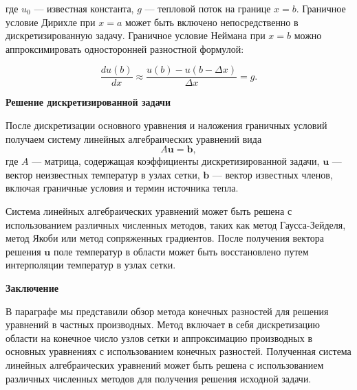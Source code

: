 где $u_0$ — известная константа,
$g$ — тепловой поток на границе $x = b$.
Граничное условие Дирихле при $x = a$ может быть
включено непосредственно в дискретизированную задачу.
Граничное условие Неймана при $x = b$ можно аппроксимировать
односторонней разностной формулой:

\begin{equation*}
\frac{du(b)}{dx} \approx \frac{u(b) - u(b - \Delta x)}{\Delta x} = g.
\end{equation*}

\textbf{Решение дискретизированной задачи}

После дискретизации основного уравнения и наложения граничных
условий получаем систему линейных алгебраических уравнений вида
\begin{equation*}
A\mathbf{u} = \mathbf{b},
\end{equation*}
где $A$ — матрица, содержащая коэффициенты дискретизированной
задачи, $\mathbf{u}$ — вектор неизвестных температур в узлах сетки,
$\mathbf{b}$ — вектор известных членов, включая граничные
условия и термин источника тепла.

Система линейных алгебраических уравнений может быть решена с
использованием различных численных методов, таких как метод
Гаусса-Зейделя, метод Якоби или метод сопряженных градиентов.
После получения вектора решения $\mathbf{u}$ поле температур в
области может быть восстановлено путем интерполяции температур в узлах сетки.

\textbf{Заключение}

В параграфе мы представили обзор метода конечных разностей
для решения уравнений в частных производных.
Метод включает в себя дискретизацию области на конечное число
узлов сетки и аппроксимацию производных в основных уравнениях
с использованием конечных разностей.
Полученная система линейных
алгебраических уравнений может быть решена с использованием различных
численных методов для получения решения исходной задачи.
